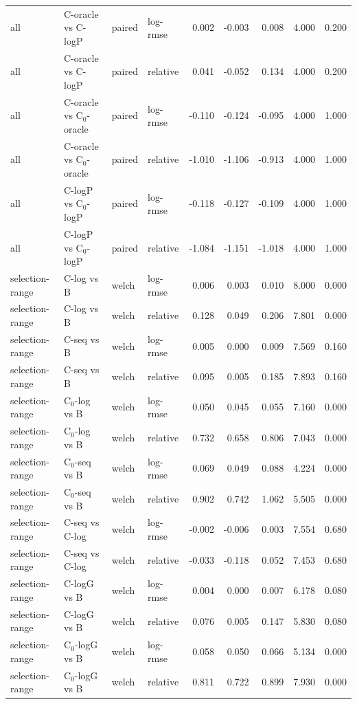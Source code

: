 \begin{longtable}{llllrrrrr}
all & C-oracle vs C-logP & paired & log-rmse & 0.002 & -0.003 & 0.008 & 4.000 & 0.200 \\
all & C-oracle vs C-logP & paired & relative & 0.041 & -0.052 & 0.134 & 4.000 & 0.200 \\
all & C-oracle vs C$_0$-oracle & paired & log-rmse & -0.110 & -0.124 & -0.095 & 4.000 & 1.000 \\
all & C-oracle vs C$_0$-oracle & paired & relative & -1.010 & -1.106 & -0.913 & 4.000 & 1.000 \\
all & C-logP vs C$_0$-logP & paired & log-rmse & -0.118 & -0.127 & -0.109 & 4.000 & 1.000 \\
all & C-logP vs C$_0$-logP & paired & relative & -1.084 & -1.151 & -1.018 & 4.000 & 1.000 \\
selection-range & C-log vs B & welch & log-rmse & 0.006 & 0.003 & 0.010 & 8.000 & 0.000 \\
selection-range & C-log vs B & welch & relative & 0.128 & 0.049 & 0.206 & 7.801 & 0.000 \\
selection-range & C-seq vs B & welch & log-rmse & 0.005 & 0.000 & 0.009 & 7.569 & 0.160 \\
selection-range & C-seq vs B & welch & relative & 0.095 & 0.005 & 0.185 & 7.893 & 0.160 \\
selection-range & C$_0$-log vs B & welch & log-rmse & 0.050 & 0.045 & 0.055 & 7.160 & 0.000 \\
selection-range & C$_0$-log vs B & welch & relative & 0.732 & 0.658 & 0.806 & 7.043 & 0.000 \\
selection-range & C$_0$-seq vs B & welch & log-rmse & 0.069 & 0.049 & 0.088 & 4.224 & 0.000 \\
selection-range & C$_0$-seq vs B & welch & relative & 0.902 & 0.742 & 1.062 & 5.505 & 0.000 \\
selection-range & C-seq vs C-log & welch & log-rmse & -0.002 & -0.006 & 0.003 & 7.554 & 0.680 \\
selection-range & C-seq vs C-log & welch & relative & -0.033 & -0.118 & 0.052 & 7.453 & 0.680 \\
selection-range & C-logG vs B & welch & log-rmse & 0.004 & 0.000 & 0.007 & 6.178 & 0.080 \\
selection-range & C-logG vs B & welch & relative & 0.076 & 0.005 & 0.147 & 5.830 & 0.080 \\
selection-range & C$_0$-logG vs B & welch & log-rmse & 0.058 & 0.050 & 0.066 & 5.134 & 0.000 \\
selection-range & C$_0$-logG vs B & welch & relative & 0.811 & 0.722 & 0.899 & 7.930 & 0.000 \\

\end{longtable}
